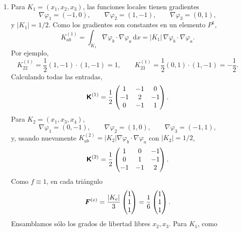 \documentclass[11pt]{article}
\def\mat   #1{\mbox{\boldmath $\mathsf #1$}}
\def\vec   #1{\mbox{\boldmath $#1$}{}}
\def\dx{\mbox{\(\,\mathrm{d}x\)}}
\begin{document}
\begin{enumerate}[label=\textbf{\arabic*.}, leftmargin=*]
\begin{enumerate}[label=(\alph*)]
        \item Para $K_1=(x_1,x_2,x_3)$, las funciones locales tienen gradientes
        \[
            \nabla\varphi_1=(-1,0),
            \qquad
            \nabla\varphi_2=(1,-1),
            \qquad
            \nabla\varphi_3=(0,1),
        \]
        y $|K_1|=1/2$. Como los gradientes son constantes en un elemento $P^1$,
        \[
            K^{(1)}_{ab}
            =
            \int_{K_1}\nabla\varphi_b\cdot\nabla\varphi_a\dx
            =
            |K_1|\,\nabla\varphi_b\cdot\nabla\varphi_a.
        \]
        Por ejemplo,
        \[
            K^{(1)}_{22}
            =
            \frac12(1,-1)\cdot(1,-1)
            =
            1,
            \qquad
            K^{(1)}_{23}
            =
            \frac12(0,1)\cdot(1,-1)
            =
            -\frac12.
        \]
        Calculando todas las entradas,
        \[
            \mat K^{(1)}
            =
            \frac12
            \begin{pmatrix}
                1&-1&0\\
                -1&2&-1\\
                0&-1&1
            \end{pmatrix}.
        \]
        Para $K_2=(x_1,x_3,x_4)$,
        \[
            \nabla\varphi_1=(0,-1),
            \qquad
            \nabla\varphi_2=(1,0),
            \qquad
            \nabla\varphi_3=(-1,1),
        \]
        y, usando nuevamente $K^{(2)}_{ab}=|K_2|\nabla\varphi_b\cdot\nabla\varphi_a$ con $|K_2|=1/2$,
        \[
            \mat K^{(2)}
            =
            \frac12
            \begin{pmatrix}
                1&0&-1\\
                0&1&-1\\
                -1&-1&2
            \end{pmatrix}.
        \]
        Como $f\equiv1$, en cada triángulo
        \[
            \vec F^{(e)}=\frac{|K_e|}{3}
            \begin{pmatrix}
                1\\1\\1
            \end{pmatrix}
            =
            \frac16
            \begin{pmatrix}
                1\\1\\1
            \end{pmatrix}.
        \]
        Ensamblamos sólo los grados de libertad libres $x_2,x_3$. Para $K_1$, como

\end{enumerate}
\end{enumerate}
\end{document}

